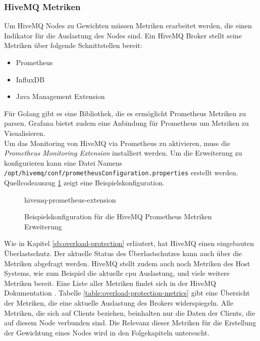 \subsubsection{HiveMQ Metriken}
Um HiveMQ Nodes zu Gewichten müssen Metriken erarbeitet werden, die einen Indikator für die Auslastung des Nodes sind. Ein HiveMQ Broker stellt seine Metriken über folgende Schnittstellen bereit:
\begin{itemize}
  \item Prometheus
  \item InfluxDB
  \item Java Management Extension
\end{itemize}
\cite{MonitoringHiveMQDocumentation}
Für Golang gibt es eine Bibliothek, die es ermöglicht Prometheus Metriken zu parsen. Grafana bietet zudem eine Anbindung für Prometheus um Metriken zu Visualisieren.\\
Um das Monitoring von HiveMQ via Prometheus zu aktivieren, muss die \textit{Prometheus Monitoring Extension} \cite{HiveMQExtensionPrometheus} installiert werden. Um die Erweiterung zu konfigurieren kann eine Datei Namens \verb|/opt/hivemq/conf/prometheusConfiguration.properties| erstellt werden. Quellcodeauszug \ref{code:hivemq-prometheus-extension} zeigt eine Beispielskonfiguration.
\begin{figure}
    {hivemq-prometheus-extension}
    \caption{Beispielskonfiguration für die HiveMQ Prometheus Metriken Erweiterung}
    \label{code:hivemq-prometheus-extension}
\end{figure}
Wie in Kapitel \ref{sb:overload-protection} erläutert, hat HiveMQ einen eingebauten Überlastschutz. Der aktuelle Status des Überlastschutzes kann auch über die Metriken abgefragt werden. HiveMQ stellt zudem auch noch Metriken des Host Systems, wie zum Beispiel die aktuelle \ac{cpu} Auslastung, und viele weitere Metriken bereit. Eine Liste aller Metriken findet sich in der HiveMQ Dokumentation \cite{MonitoringHiveMQDocumentation}. Tabelle \ref{table:overload-protection-metrics} gibt eine Übersicht der Metriken, die eine aktuelle Auslastung des Brokers widerspiegeln. Alle Metriken, die sich auf Clients beziehen, beinhalten nur die Daten der Clients, die auf diesem Node verbunden sind. Die Relevanz dieser Metriken für die Erstellung der Gewichtung eines Nodes wird in den Folgekapiteln untersucht.
\cite{ClusterOverloadProtection}
